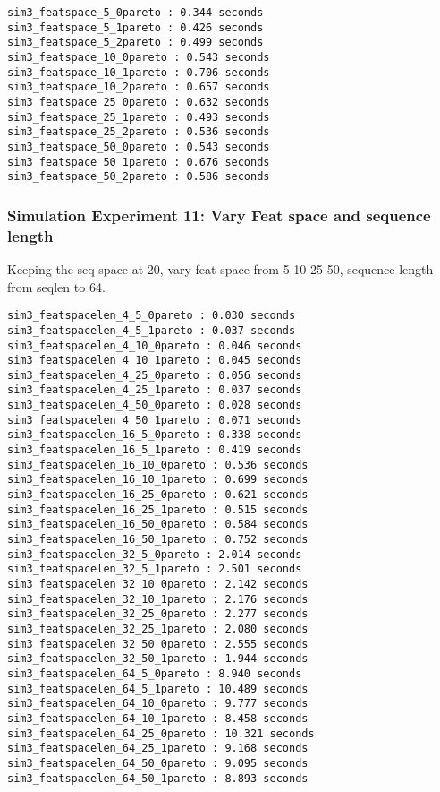 \begin{verbatim}
sim3_featspace_5_0pareto : 0.344 seconds
sim3_featspace_5_1pareto : 0.426 seconds
sim3_featspace_5_2pareto : 0.499 seconds
sim3_featspace_10_0pareto : 0.543 seconds
sim3_featspace_10_1pareto : 0.706 seconds
sim3_featspace_10_2pareto : 0.657 seconds
sim3_featspace_25_0pareto : 0.632 seconds
sim3_featspace_25_1pareto : 0.493 seconds
sim3_featspace_25_2pareto : 0.536 seconds
sim3_featspace_50_0pareto : 0.543 seconds
sim3_featspace_50_1pareto : 0.676 seconds
sim3_featspace_50_2pareto : 0.586 seconds
\end{verbatim}

\subsubsection{Simulation Experiment 11: Vary Feat space and sequence length}
\label{sim:featspacelen}
Keeping the seq space at 20, vary feat space from 5-10-25-50, sequence length from seqlen to 64.

\begin{verbatim}
sim3_featspacelen_4_5_0pareto : 0.030 seconds
sim3_featspacelen_4_5_1pareto : 0.037 seconds
sim3_featspacelen_4_10_0pareto : 0.046 seconds
sim3_featspacelen_4_10_1pareto : 0.045 seconds
sim3_featspacelen_4_25_0pareto : 0.056 seconds
sim3_featspacelen_4_25_1pareto : 0.037 seconds
sim3_featspacelen_4_50_0pareto : 0.028 seconds
sim3_featspacelen_4_50_1pareto : 0.071 seconds
sim3_featspacelen_16_5_0pareto : 0.338 seconds
sim3_featspacelen_16_5_1pareto : 0.419 seconds
sim3_featspacelen_16_10_0pareto : 0.536 seconds
sim3_featspacelen_16_10_1pareto : 0.699 seconds
sim3_featspacelen_16_25_0pareto : 0.621 seconds
sim3_featspacelen_16_25_1pareto : 0.515 seconds
sim3_featspacelen_16_50_0pareto : 0.584 seconds
sim3_featspacelen_16_50_1pareto : 0.752 seconds
sim3_featspacelen_32_5_0pareto : 2.014 seconds
sim3_featspacelen_32_5_1pareto : 2.501 seconds
sim3_featspacelen_32_10_0pareto : 2.142 seconds
sim3_featspacelen_32_10_1pareto : 2.176 seconds
sim3_featspacelen_32_25_0pareto : 2.277 seconds
sim3_featspacelen_32_25_1pareto : 2.080 seconds
sim3_featspacelen_32_50_0pareto : 2.555 seconds
sim3_featspacelen_32_50_1pareto : 1.944 seconds
sim3_featspacelen_64_5_0pareto : 8.940 seconds
sim3_featspacelen_64_5_1pareto : 10.489 seconds
sim3_featspacelen_64_10_0pareto : 9.777 seconds
sim3_featspacelen_64_10_1pareto : 8.458 seconds
sim3_featspacelen_64_25_0pareto : 10.321 seconds
sim3_featspacelen_64_25_1pareto : 9.168 seconds
sim3_featspacelen_64_50_0pareto : 9.095 seconds
sim3_featspacelen_64_50_1pareto : 8.893 seconds
\end{verbatim}
%
